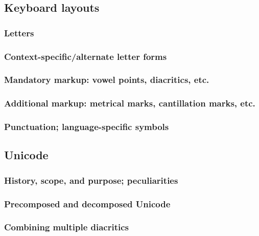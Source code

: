 \documentclass[11pt]{article}
\begin{document}
\subsection{Keyboard layouts}
\label{sec:org502921b}

\subsubsection{Letters}
\label{sec:org76d58be}

\subsubsection{Context-specific/alternate letter forms}
\label{sec:org42e8324}

\subsubsection{Mandatory markup: vowel points, diacritics, etc.}
\label{sec:orgfa7df35}

\subsubsection{Additional markup: metrical marks, cantillation marks, etc.}
\label{sec:orgbad77d5}

\subsubsection{Punctuation; language-specific symbols}
\label{sec:orgde03eb4}

\subsection{Unicode}
\label{sec:org33da086}

\subsubsection{History, scope, and purpose; peculiarities}
\label{sec:orga9cc9da}

\subsubsection{Precomposed and decomposed Unicode}
\label{sec:org14f5524}

\subsubsection{Combining multiple diacritics}
\label{sec:org33bac2f}
\end{document}
